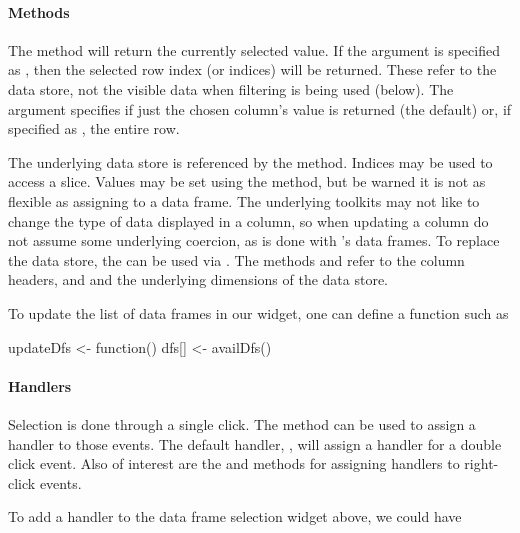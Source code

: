 \paragraph{Methods}
The  method will return the currently selected
value. If the argument  is specified as , then
the selected row index (or indices) will be returned. These refer to
the data store, not the visible data when filtering is being used (below). The
argument  specifies if just the chosen column's value is
returned (the default) or, if specified as , the entire row.
 
The underlying data store is referenced by the \method{[}{gtable}
method. Indices may be used to access a slice. Values may be
set using the \method{[\ASSIGN}{gtable} method, but be warned it is
not as flexible as assigning to a data frame. The underlying
toolkits may not like to change the type of data displayed in a
column, so when updating a column do not assume some underlying
coercion, as is done with \R's data frames. To replace the data store, the \code{[\ASSIGN} can
be used via . The methods
 and  refer to the
column headers, and  and 
the underlying dimensions of the data store.

To update the list of data frames in our  widget, one can define a function such as
\begin{Schunk}
\begin{Sinput}
 updateDfs <- function() {
   dfs[] <- availDfs()
 }
\end{Sinput}
\end{Schunk}


\paragraph{Handlers}
Selection is done through a single click. The 
method can be used to assign a handler to those events. The default
handler, , will assign a
handler for a double click event. Also of interest are the
 and
 methods for assigning handlers
to right-click events.


To add a handler to the data frame selection widget above, we could have
\begin{Schunk}
\end{Schunk}



